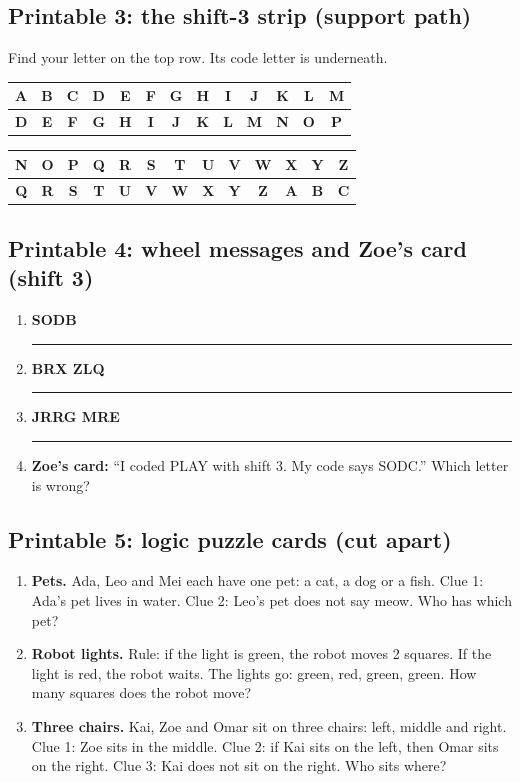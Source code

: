 \subsection*{Printable 3: the shift-3 strip (support path)}
Find your letter on the top row. Its code letter is underneath.
\begin{center}
\small\renewcommand{\arraystretch}{1.5}\setlength{\tabcolsep}{2.5pt}
\begin{tabular}{|*{13}{c|}}
\hline
A&B&C&D&E&F&G&H&I&J&K&L&M\\ \hline
\textbf{D}&\textbf{E}&\textbf{F}&\textbf{G}&\textbf{H}&\textbf{I}&\textbf{J}&\textbf{K}&\textbf{L}&\textbf{M}&\textbf{N}&\textbf{O}&\textbf{P}\\ \hline
\end{tabular}

\medskip
\begin{tabular}{|*{13}{c|}}
\hline
N&O&P&Q&R&S&T&U&V&W&X&Y&Z\\ \hline
\textbf{Q}&\textbf{R}&\textbf{S}&\textbf{T}&\textbf{U}&\textbf{V}&\textbf{W}&\textbf{X}&\textbf{Y}&\textbf{Z}&\textbf{A}&\textbf{B}&\textbf{C}\\ \hline
\end{tabular}
\end{center}

\subsection*{Printable 4: wheel messages and Zoe's card (shift 3)}
\begin{enumerate}[leftmargin=1.6em,itemsep=6pt]
  \item \textbf{SODB} \hfill \rule{5cm}{0.4pt}
  \item \textbf{BRX ZLQ} \hfill \rule{5cm}{0.4pt}
  \item \textbf{JRRG MRE} \hfill \rule{5cm}{0.4pt}
  \item \textbf{Zoe's card:} \enquote{I coded PLAY with shift 3. My code says SODC.} Which letter is wrong?
\end{enumerate}

\subsection*{Printable 5: logic puzzle cards (cut apart)}
\begin{enumerate}[leftmargin=1.6em,itemsep=6pt]
  \item \textbf{Pets.} Ada, Leo and Mei each have one pet: a cat, a dog or a fish. Clue 1: Ada's pet lives in water. Clue 2: Leo's pet does not say meow. Who has which pet?
  \item \textbf{Robot lights.} Rule: if the light is green, the robot moves 2 squares. If the light is red, the robot waits. The lights go: green, red, green, green. How many squares does the robot move?
  \item \textbf{Three chairs.} Kai, Zoe and Omar sit on three chairs: left, middle and right. Clue 1: Zoe sits in the middle. Clue 2: if Kai sits on the left, then Omar sits on the right. Clue 3: Kai does not sit on the right. Who sits where?
\end{enumerate}

